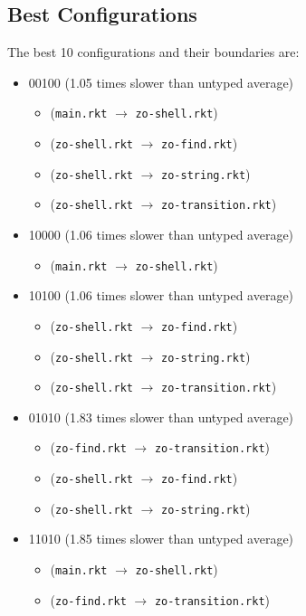 \documentclass{article}
\newcommand{\mono}[1]{\texttt{#1}}
\begin{document}
\subsection{Best Configurations}
The best 10 configurations and their boundaries are:
\begin{itemize}
\item 00100 (1.05 times slower than untyped average)
  \begin{itemize}
  \item (\mono{main.rkt} $\rightarrow$ \mono{zo-shell.rkt})
  \item (\mono{zo-shell.rkt} $\rightarrow$ \mono{zo-find.rkt})
  \item (\mono{zo-shell.rkt} $\rightarrow$ \mono{zo-string.rkt})
  \item (\mono{zo-shell.rkt} $\rightarrow$ \mono{zo-transition.rkt})
  \end{itemize}
\item 10000 (1.06 times slower than untyped average)
  \begin{itemize}
  \item (\mono{main.rkt} $\rightarrow$ \mono{zo-shell.rkt})
  \end{itemize}
\item 10100 (1.06 times slower than untyped average)
  \begin{itemize}
  \item (\mono{zo-shell.rkt} $\rightarrow$ \mono{zo-find.rkt})
  \item (\mono{zo-shell.rkt} $\rightarrow$ \mono{zo-string.rkt})
  \item (\mono{zo-shell.rkt} $\rightarrow$ \mono{zo-transition.rkt})
  \end{itemize}
\item 01010 (1.83 times slower than untyped average)
  \begin{itemize}
  \item (\mono{zo-find.rkt} $\rightarrow$ \mono{zo-transition.rkt})
  \item (\mono{zo-shell.rkt} $\rightarrow$ \mono{zo-find.rkt})
  \item (\mono{zo-shell.rkt} $\rightarrow$ \mono{zo-string.rkt})
  \end{itemize}
\item 11010 (1.85 times slower than untyped average)
  \begin{itemize}
  \item (\mono{main.rkt} $\rightarrow$ \mono{zo-shell.rkt})
  \item (\mono{zo-find.rkt} $\rightarrow$ \mono{zo-transition.rkt})

\end{itemize}
\end{itemize}
\end{document}
